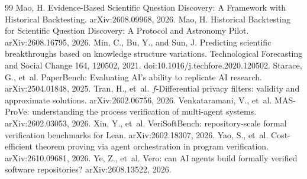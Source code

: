\documentclass[11pt]{article}
\begin{document}
\begin{thebibliography}{99}
 Mao, H. Evidence-Based Scientific Question Discovery: A Framework with Historical Backtesting. arXiv:2608.09968, 2026.
 Mao, H. Historical Backtesting for Scientific Question Discovery: A Protocol and Astronomy Pilot. arXiv:2608.16795, 2026.
 Min, C., Bu, Y., and Sun, J. Predicting scientific breakthroughs based on knowledge structure variations. Technological Forecasting and Social Change 164, 120502, 2021. doi:10.1016/j.techfore.2020.120502.
 Starace, G., et~al. PaperBench: Evaluating AI's ability to replicate AI research. arXiv:2504.01848, 2025.
 Tran, H., et~al. $f$-Differential privacy filters: validity and approximate solutions. arXiv:2602.06756, 2026.
 Venkataramani, V., et~al. MAS-ProVe: understanding the process verification of multi-agent systems. arXiv:2602.03053, 2026.
 Xin, Y., et~al. VeriSoftBench: repository-scale formal verification benchmarks for Lean. arXiv:2602.18307, 2026.
 Yao, S., et~al. Cost-efficient theorem proving via agent orchestration in program verification. arXiv:2610.09681, 2026.
 Ye, Z., et~al. Vero: can AI agents build formally verified software repositories? arXiv:2608.13522, 2026.
\end{thebibliography}
\end{document}

